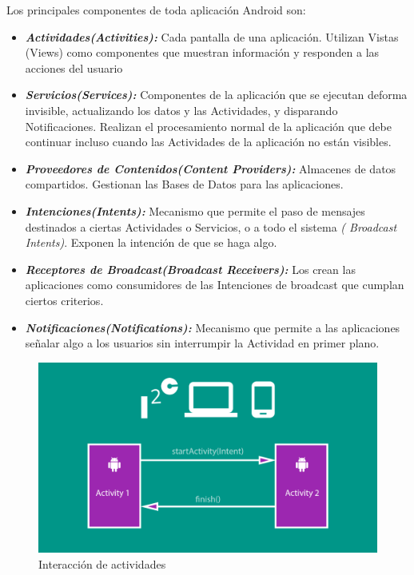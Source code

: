 Los principales componentes de toda aplicación Android son:
\begin{itemize}
	 
	\item \emph{\textbf{Actividades\textit{(Activities)}: }} Cada pantalla de una aplicación. Utilizan Vistas (Views) como componentes que muestran información y responden a las acciones del usuario 

	\item \emph{\textbf{Servicios\textit{(Services)}: }} Componentes de la aplicación que se ejecutan deforma invisible, actualizando los datos y las Actividades, y disparando Notificaciones. Realizan el procesamiento normal de la aplicación que debe continuar incluso cuando las Actividades de la aplicación no están visibles. 
	
	\item \emph{\textbf{ Proveedores de Contenidos\textit{(Content Providers)}: }}   Almacenes de datos compartidos. Gestionan las Bases de Datos para las aplicaciones. 

	\item \emph{\textbf{Intenciones\textit{(Intents)}: }} Mecanismo que permite el paso de mensajes destinados a ciertas Actividades o Servicios, o a todo el sistema \textit{( Broadcast Intents)}. Exponen la intención de que se haga algo. 
	
	\item \emph{\textbf{Receptores de Broadcast\textit{(Broadcast Receivers)}: }} Los crean las aplicaciones como consumidores de las Intenciones de broadcast que cumplan ciertos criterios. 

	\item \emph{\textbf{Notificaciones\textit{(Notifications)}: }} Mecanismo que permite a las aplicaciones señalar algo a los usuarios sin interrumpir la Actividad en primer plano. 
\end{itemize}

\begin{figure}[H]
	\centering
	\includegraphics[width=0.8\linewidth]{figuras/activity}
	\caption{Interacción de actividades}
	\label{fig:activity}
\end{figure}



